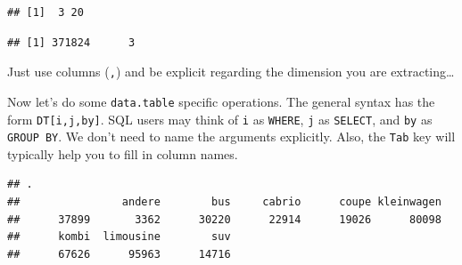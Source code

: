 \documentclass[]{book}
\newenvironment{Shaded}{\begin{snugshade}}{\end{snugshade}}
\newcommand{\KeywordTok}[1]{\textcolor[rgb]{0.13,0.29,0.53}{\textbf{#1}}}
\newcommand{\DecValTok}[1]{\textcolor[rgb]{0.00,0.00,0.81}{#1}}
\newcommand{\StringTok}[1]{\textcolor[rgb]{0.31,0.60,0.02}{#1}}
\newcommand{\CommentTok}[1]{\textcolor[rgb]{0.56,0.35,0.01}{\textit{#1}}}
\newcommand{\OperatorTok}[1]{\textcolor[rgb]{0.81,0.36,0.00}{\textbf{#1}}}
\newcommand{\NormalTok}[1]{#1}
\theoremstyle{definition}
\theoremstyle{definition}
\theoremstyle{definition}
\theoremstyle{remark}
\begin{document}
\begin{Shaded}
\end{Shaded}

\begin{verbatim}
## [1]  3 20
\end{verbatim}

\begin{Shaded}
\end{Shaded}

\begin{verbatim}
## [1] 371824      3
\end{verbatim}

Just use columns (\texttt{,}) and be explicit regarding the dimension
you are extracting\ldots{}

Now let's do some \texttt{data.table} specific operations. The general
syntax has the form \texttt{DT{[}i,j,by{]}}. SQL users may think of
\texttt{i} as \texttt{WHERE}, \texttt{j} as \texttt{SELECT}, and
\texttt{by} as \texttt{GROUP\ BY}. We don't need to name the arguments
explicitly. Also, the \texttt{Tab} key will typically help you to fill
in column names.

\begin{Shaded}
\end{Shaded}

\begin{verbatim}
## .
##                andere        bus     cabrio      coupe kleinwagen 
##      37899       3362      30220      22914      19026      80098 
##      kombi  limousine        suv 
##      67626      95963      14716
\end{verbatim}

\begin{Shaded}
\end{Shaded}
\end{document}
